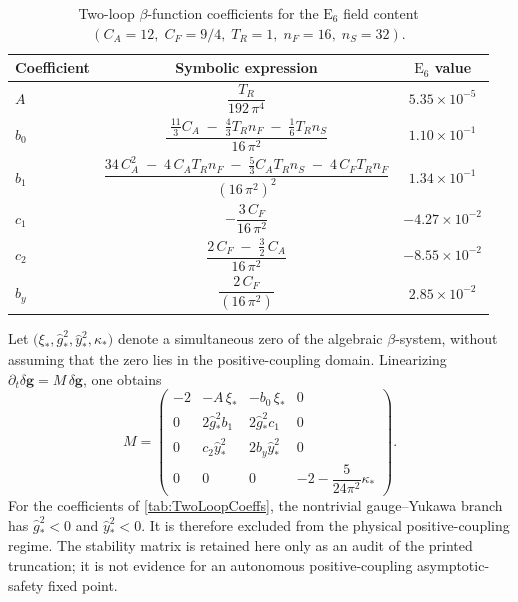 \documentclass[pdflatex,sn-mathphys-num]{sn-jnl}
\theoremstyle{thmstyleone}
\theoremstyle{thmstylethree}%
\theoremstyle{thmstyletwo}%
\begin{document}
\begin{appendices}
\begin{table}[h]
\renewcommand{\arraystretch}{1.5}
\centering
\caption{Two-loop $\beta$-function coefficients for the $\mathrm E_{6}$ field content $(C_{A}=12,\;C_{F}=9/4,\;T_{R}=1,\;n_{F}=16,\;n_{S}=32)$.}
\label{tab:TwoLoopCoeffs}
\renewcommand{\arraystretch}{1.35}
\begin{tabular}{lcc}
\hline
Coefficient & Symbolic expression & $\mathrm E_{6}$ value \\ \hline
$\displaystyle A$   &
\rule{0pt}{1.8em} $\dfrac{T_{R}}{192\,\pi^{4}}$ &
$5.35\times10^{-5}$ \\[9pt]

$\displaystyle b_{0}$ &
$\dfrac{\;\tfrac{11}{3}C_{A}\;-\;\tfrac{4}{3}T_{R}n_{F}\;-\;\tfrac16 T_{R}n_{S}}{16\,\pi^{2}}$ &
$1.10\times10^{-1}$ \\[9pt]

$\displaystyle b_{1}$ &
$\dfrac{34\,C_{A}^{2}\;-\;4\,C_{A}T_{R}n_{F}\;-\;\tfrac53 C_{A}T_{R}n_{S}\;-\;4\,C_{F}T_{R}n_{F}}
       {(16\,\pi^{2})^{2}}$ &
$1.34\times10^{-1}$ \\[9pt]

$\displaystyle c_{1}$ &
$-\dfrac{3\,C_{F}}{16\,\pi^{2}}$ &
$-4.27\times10^{-2}$ \\[9pt]

$\displaystyle c_{2}$ &
$\dfrac{2\,C_{F}\;-\;\tfrac32\,C_{A}}{16\,\pi^{2}}$ &
$-8.55\times10^{-2}$ \\[9pt]

$\displaystyle b_{y}$ &
$\dfrac{2\,C_{F}}{(16\,\pi^{2})}$ &
$2.85\times10^{-2}$ \\[9pt] \hline
\end{tabular}
\end{table}

Let
\(\bigl(\xi_{\ast},\hat g^{2}_{\ast},
        \hat y^{2}_{\ast},\kappa_{\ast}\bigr)\)
denote a simultaneous zero of the algebraic $\beta$-system, without assuming
that the zero lies in the positive-coupling domain. Linearizing
\(\partial_{t}\delta\mathbf g=M\,\delta\mathbf g\), one obtains
\begin{equation}\label{eq:Mmatrix}
  M=
  \begin{pmatrix}
    -2 & -A\,\xi_{\ast} & -b_{0}\,\xi_{\ast} & 0 \\
     0 &  2\hat g^{2}_{\ast} b_{1}
        &  2\hat g^{2}_{\ast} c_{1} & 0 \\
     0 &  c_{2}\hat y^{2}_{\ast}
        &  2b_{y}\hat y^{2}_{\ast} & 0 \\
     0 &  0 & 0
        & -2-\dfrac{5}{24\pi^{2}}\kappa_{\ast}
  \end{pmatrix}.
\end{equation}
For the coefficients of \autoref{tab:TwoLoopCoeffs}, the nontrivial
gauge--Yukawa branch has \(\hat g^{2}_{\ast}<0\) and
\(\hat y^{2}_{\ast}<0\). It is therefore excluded from the physical
positive-coupling regime. The stability matrix is retained here only as an
audit of the printed truncation; it is not evidence for an autonomous
positive-coupling asymptotic-safety fixed point.


\end{appendices}
\end{document}
